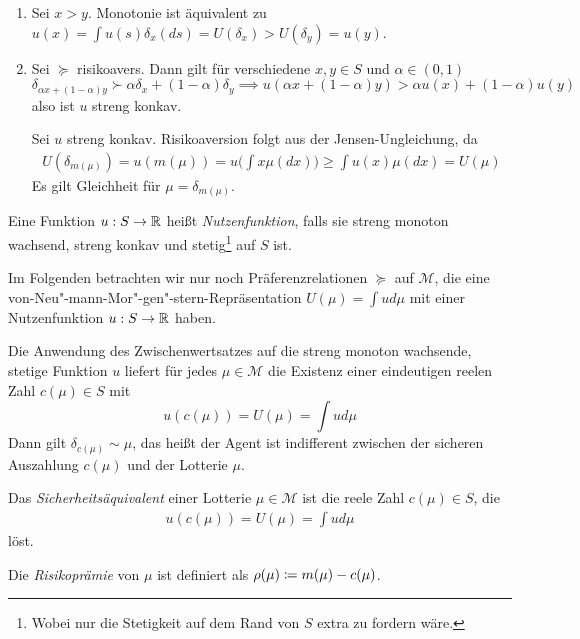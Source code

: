 \documentclass[a4paper,twoside,DIV15,BCOR12mm]{scrbook}
\newcommand{\cM}{\mathcal M}
\begin{document}
\begin{beweis}
\begin{enumerate}
\item Sei $x>y$. Monotonie ist äquivalent zu $u(x)=\int u(s) \delta_x(ds) = U(\delta_x) > U(\delta_y) = u(y)$.
\item Sei $\succeq$ risikoavers. Dann gilt für verschiedene $x,y\in S$ und $\alpha \in (0, 1)$
\[
\delta_{\alpha x + (1-\alpha) y} \succ \alpha \delta_x + (1-\alpha)\delta_y
\implies
u(\alpha x + (1-\alpha ) y) > \alpha u(x) + (1-\alpha) u(y)
\]
also ist $u$ streng konkav.

Sei $u$ streng konkav. Risikoaversion folgt aus der Jensen-Ungleichung, da
\begin{align*}
U(\delta_{m(\mu)}) = u(m(\mu)) = u\Big(\int x \mu (dx)\Big) \ge \int u(x) \mu(dx) = U(\mu)
\end{align*}
Es gilt Gleichheit für $\mu = \delta_{m(\mu)}$.
\end{enumerate}
\end{beweis}

\begin{definition}
Eine Funktion $u:S\to\mathbb{R}$ heißt \emph{Nutzenfunktion}, falls sie streng monoton wachsend, streng konkav und stetig\footnote{Wobei nur die Stetigkeit auf dem Rand von $S$ extra zu fordern wäre.} auf $S$ ist.
\end{definition}

Im Folgenden betrachten wir nur noch Präferenzrelationen $\succeq$ auf $\cM$, die eine von-Neu"-mann-Mor"-gen"-stern-Repräsentation $U(\mu) = \int u d \mu$ mit einer Nutzenfunktion $u:S\to\mathbb{R}$ haben. 

Die Anwendung des Zwischenwertsatzes auf die streng monoton wachsende, stetige Funktion $u$ liefert für jedes $\mu\in\cM$ die Existenz einer eindeutigen reelen Zahl $c(\mu)\in S$ mit
\[u(c(\mu)) = U(\mu) = \int ud\mu\]
Dann gilt $\delta_{c(\mu)} \sim \mu$, das heißt der Agent ist indifferent zwischen der sicheren Auszahlung $c(\mu)$ und der Lotterie $\mu$. 

\begin{definition}
Das \emph{Sicherheitsäquivalent} einer Lotterie $\mu\in \cM$ ist die reele Zahl $c(\mu)\in S$, die 
\begin{align*}
u(c(\mu)) = U(\mu) = \int ud\mu
\end{align*}
löst.

Die \emph{Risikoprämie} von $\mu$ ist definiert als $\rho(\mu)\da m(\mu) - c(\mu)$.
\end{definition}
\end{document}

